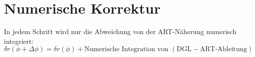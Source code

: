 \section{Numerische Korrektur}
In jedem Schritt wird nur die Abweichung von der ART-Näherung numerisch integriert:
\[
\delta r(\phi + \Delta \phi) = \delta r(\phi) + \text{Numerische Integration von } \left( \text{DGL} - \text{ART-Ableitung} \right)
\]
